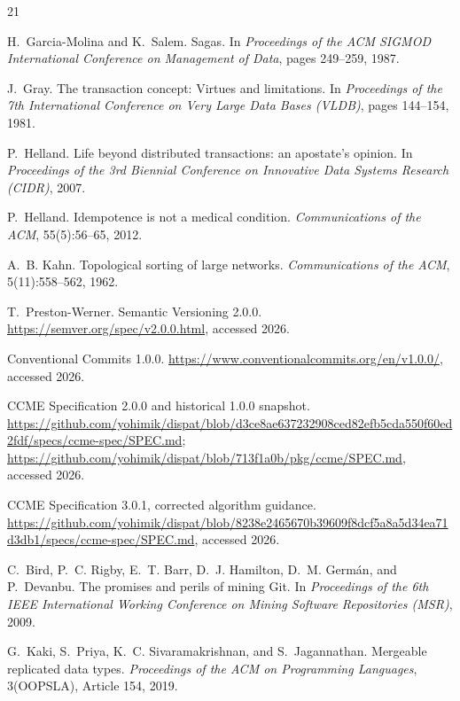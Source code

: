 \documentclass[sigconf,nonacm]{acmart}
\begin{document}
\vfuzz=2pt
\begin{thebibliography}{21}

H.~Garcia-Molina and K.~Salem.
Sagas.
In \emph{Proceedings of the ACM SIGMOD International Conference on
Management of Data}, pages 249--259, 1987.

J.~Gray.
The transaction concept: Virtues and limitations.
In \emph{Proceedings of the 7th International Conference on Very Large
Data Bases (VLDB)}, pages 144--154, 1981.

P.~Helland.
Life beyond distributed transactions: an apostate's opinion.
In \emph{Proceedings of the 3rd Biennial Conference on Innovative Data
Systems Research (CIDR)}, 2007.

P.~Helland.
Idempotence is not a medical condition.
\emph{Communications of the ACM}, 55(5):56--65, 2012.

A.~B. Kahn.
Topological sorting of large networks.
\emph{Communications of the ACM}, 5(11):558--562, 1962.

T.~Preston-Werner.
Semantic Versioning 2.0.0.
\url{https://semver.org/spec/v2.0.0.html}, accessed 2026.

Conventional Commits 1.0.0.
\url{https://www.conventionalcommits.org/en/v1.0.0/}, accessed 2026.

CCME Specification 2.0.0 and historical 1.0.0 snapshot.
\url{https://github.com/yohimik/dispat/blob/d3ce8ae637232908ced82efb5cda550f60ed2fdf/specs/ccme-spec/SPEC.md};
\url{https://github.com/yohimik/dispat/blob/713f1a0b/pkg/ccme/SPEC.md},
accessed 2026.

CCME Specification 3.0.1, corrected algorithm guidance.
\url{https://github.com/yohimik/dispat/blob/8238e2465670b39609f8dcf5a8a5d34ea71d3db1/specs/ccme-spec/SPEC.md},
accessed 2026.

C.~Bird, P.~C. Rigby, E.~T. Barr, D.~J. Hamilton, D.~M. Germ\'an, and
P.~Devanbu.
The promises and perils of mining Git.
In \emph{Proceedings of the 6th IEEE International Working Conference
on Mining Software Repositories (MSR)}, 2009.

G.~Kaki, S.~Priya, K.~C. Sivaramakrishnan, and S.~Jagannathan.
Mergeable replicated data types.
\emph{Proceedings of the ACM on Programming Languages},
3(OOPSLA), Article 154, 2019.


\end{thebibliography}
\end{document}
